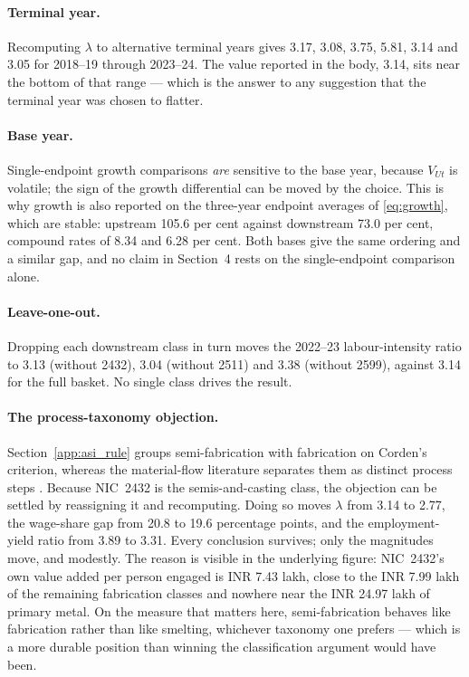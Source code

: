 \paragraph{Terminal year.} Recomputing $\lambda$ to alternative terminal years gives
3.17, 3.08, 3.75, 5.81, 3.14 and 3.05 for 2018--19 through 2023--24. The value
reported in the body, 3.14, sits near the bottom of that range --- which is the answer
to any suggestion that the terminal year was chosen to flatter.

\paragraph{Base year.} Single-endpoint growth comparisons \emph{are} sensitive to the
base year, because $V_{Ut}$ is volatile; the sign of the growth differential can be
moved by the choice. This is why growth is also reported on the three-year endpoint
averages of \eqref{eq:growth}, which are stable: upstream 105.6 per cent against
downstream 73.0 per cent, compound rates of 8.34 and 6.28 per cent. Both bases give
the same ordering and a similar gap, and no claim in Section~4 rests on the
single-endpoint comparison alone.

\paragraph{Leave-one-out.} Dropping each downstream class in turn moves the 2022--23
labour-intensity ratio to 3.13 (without 2432), 3.04 (without 2511) and 3.38 (without
2599), against 3.14 for the full basket. No single class drives the result.

\paragraph{The process-taxonomy objection.} Section~\ref{app:asi_rule} groups
semi-fabrication with fabrication on Corden's criterion, whereas the material-flow
literature separates them as distinct process steps \cite{cullen2013,bertram2009}.
Because NIC~2432 is the semis-and-casting class, the objection can be settled by
reassigning it and recomputing. Doing so moves $\lambda$ from 3.14 to 2.77, the
wage-share gap from 20.8 to 19.6 percentage points, and the employment-yield ratio
from 3.89 to 3.31. Every conclusion survives; only the magnitudes move, and modestly.
The reason is visible in the underlying figure: NIC~2432's own value added per person
engaged is INR 7.43 lakh, close to the INR 7.99 lakh of the remaining fabrication
classes and nowhere near the INR 24.97 lakh of primary metal. On the measure that
matters here, semi-fabrication behaves like fabrication rather than like smelting,
whichever taxonomy one prefers --- which is a more durable position than winning the
classification argument would have been.

